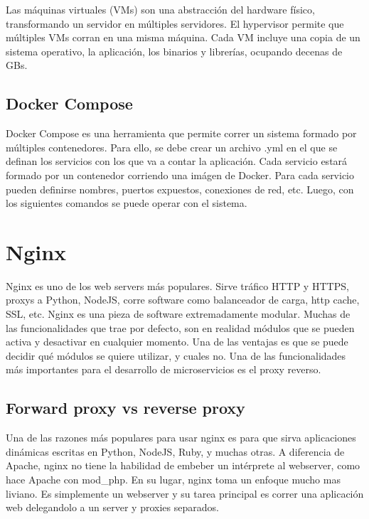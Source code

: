 \break

Las máquinas virtuales (VMs) son una abstracción del hardware físico, transformando un servidor en múltiples servidores. El hypervisor permite que múltiples VMs corran en una misma máquina. Cada VM incluye una copia de un sistema operativo, la aplicación, los binarios y librerías, ocupando decenas de GBs.


\subsection[Docker Compose]{Docker Compose}

Docker Compose es una herramienta que permite correr un sistema formado por múltiples contenedores. Para ello, se debe crear un archivo .yml en el que se definan los servicios con los que va a contar la aplicación. Cada servicio estará formado por un contenedor corriendo una imágen de Docker. 
Para cada servicio pueden definirse nombres, puertos expuestos, conexiones de red, etc. Luego, con los siguientes comandos se puede operar con el sistema.

\section[Nginx]{Nginx}

Nginx es uno de los web servers más populares. Sirve tráfico HTTP y HTTPS, proxys a Python, NodeJS, corre software como balanceador de carga, http cache, SSL, etc.
Nginx es una pieza de software extremadamente modular. Muchas de las funcionalidades que trae por defecto, son en realidad módulos que se pueden activa y desactivar en cualquier momento. Una de las ventajas es que se puede decidir qué módulos se quiere utilizar, y cuales no.
Una de las funcionalidades más importantes para el desarrollo de microservicios es el proxy reverso.

\subsection[Forward proxy vs reverse proxy]{Forward proxy vs reverse proxy}

Una de las razones más populares para usar nginx es para que sirva aplicaciones dinámicas escritas en Python, NodeJS, Ruby, y muchas otras.
A diferencia de Apache, nginx no tiene la habilidad de embeber un intérprete al webserver, como hace Apache con mod\_php. En su lugar, nginx toma un enfoque mucho mas liviano. Es simplemente un webserver y su tarea principal es correr una aplicación web delegandolo a un server y proxies separados.

